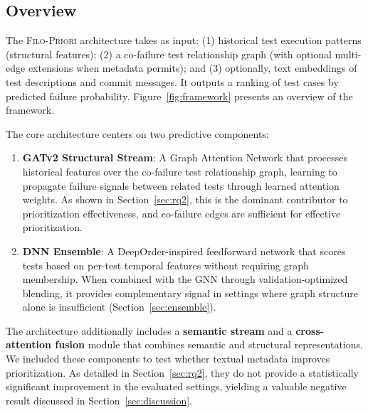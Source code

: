 \documentclass[10pt,journal,compsoc]{IEEEtran}
\newcommand{\filopriori}{\textsc{Filo-Priori}}
\begin{document}
\subsection{Overview}

The \filopriori{} architecture takes as input: (1) historical test execution
patterns (structural features); (2) a co-failure test relationship graph
(with optional multi-edge extensions when metadata permits); and
(3) optionally, text embeddings of test descriptions and commit messages. It
outputs a ranking of test cases by predicted failure probability.
Figure~\ref{fig:framework} presents an overview of the framework.

The core architecture centers on two predictive components:
\begin{enumerate}
    \item \textbf{GATv2 Structural Stream}: A Graph Attention Network that
    processes historical features over the co-failure test relationship
    graph, learning to propagate failure signals between related tests
    through learned attention weights. As shown in Section~\ref{sec:rq2},
    this is the dominant contributor to prioritization effectiveness, and
    co-failure edges are sufficient for effective prioritization.
    \item \textbf{DNN Ensemble}: A DeepOrder-inspired feedforward network that
    scores tests based on per-test temporal features without requiring graph
    membership. When combined with the GNN through validation-optimized
    blending, it provides complementary signal in settings where graph
    structure alone is insufficient (Section~\ref{sec:ensemble}).
\end{enumerate}

The architecture additionally includes a \textbf{semantic stream}
and a \textbf{cross-attention fusion} module that combines semantic and
structural representations. We included these components to test whether
textual metadata improves prioritization. As detailed in
Section~\ref{sec:rq2}, they do not provide a statistically significant
improvement in the evaluated settings, yielding a valuable negative result
discussed in Section~\ref{sec:discussion}.
\end{document}
